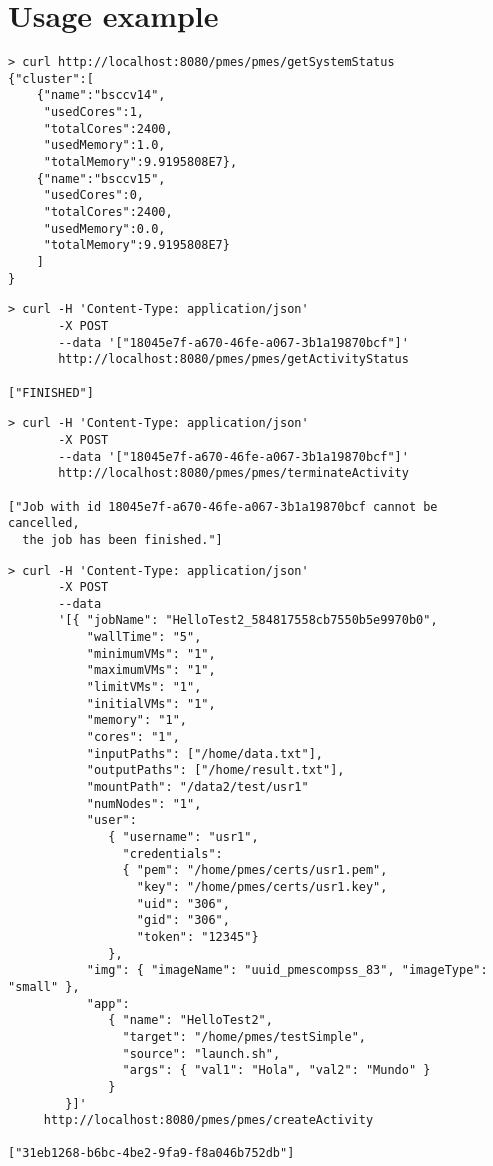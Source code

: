 \documentclass[a4paper,10pt]{article}
\begin{document}
\section{Usage example}


\begin{lstlisting}[caption=getSystemStatus]
> curl http://localhost:8080/pmes/pmes/getSystemStatus
{"cluster":[
    {"name":"bsccv14",
     "usedCores":1,
     "totalCores":2400,
     "usedMemory":1.0,
     "totalMemory":9.9195808E7},
    {"name":"bsccv15",
     "usedCores":0,
     "totalCores":2400,
     "usedMemory":0.0,
     "totalMemory":9.9195808E7}
    ]
}
\end{lstlisting}

\begin{lstlisting}[caption=getActivityStatus]
> curl -H 'Content-Type: application/json' 
       -X POST 
       --data '["18045e7f-a670-46fe-a067-3b1a19870bcf"]'
       http://localhost:8080/pmes/pmes/getActivityStatus

["FINISHED"]
\end{lstlisting}

\begin{lstlisting}[caption=terminateActivity]
> curl -H 'Content-Type: application/json'
       -X POST
       --data '["18045e7f-a670-46fe-a067-3b1a19870bcf"]'
       http://localhost:8080/pmes/pmes/terminateActivity

["Job with id 18045e7f-a670-46fe-a067-3b1a19870bcf cannot be cancelled,
  the job has been finished."]
\end{lstlisting}


\begin{lstlisting}[caption=createActivity]
> curl -H 'Content-Type: application/json'
       -X POST
       --data 
       '[{ "jobName": "HelloTest2_584817558cb7550b5e9970b0",
           "wallTime": "5",
           "minimumVMs": "1",
           "maximumVMs": "1",
           "limitVMs": "1",
           "initialVMs": "1",
           "memory": "1",
           "cores": "1",
           "inputPaths": ["/home/data.txt"],
           "outputPaths": ["/home/result.txt"],
           "mountPath": "/data2/test/usr1"
           "numNodes": "1",
           "user": 
              { "username": "usr1",
                "credentials": 
                { "pem": "/home/pmes/certs/usr1.pem",
                  "key": "/home/pmes/certs/usr1.key",
                  "uid": "306",
                  "gid": "306",
                  "token": "12345"} 
              },
           "img": { "imageName": "uuid_pmescompss_83", "imageType": "small" },
           "app": 
              { "name": "HelloTest2",
                "target": "/home/pmes/testSimple",
                "source": "launch.sh",
                "args": { "val1": "Hola", "val2": "Mundo" } 
              } 
        }]'
     http://localhost:8080/pmes/pmes/createActivity

["31eb1268-b6bc-4be2-9fa9-f8a046b752db"]
\end{lstlisting}
\end{document}
